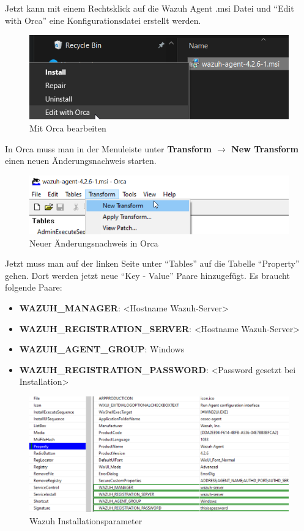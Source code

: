 Jetzt kann mit einem Rechtsklick auf die Wazuh Agent .msi Datei und ``Edit with Orca'' eine Konfigurationsdatei erstellt werden.
\begin{figure}[H]
    \centering
    \includegraphics[width=0.7\linewidth]{../img/agent/edit-with-orca.png}
    \caption{Mit Orca bearbeiten}
\end{figure}

In Orca muss man in der Menuleiste unter \textbf{Transform $\rightarrow$ New Transform} einen neuen Änderungsnachweis starten.
\begin{figure}[H]
    \centering
    \includegraphics[width=0.7\linewidth]{../img/agent/new-transform.png}
    \caption{Neuer Änderungsnachweis in Orca}
\end{figure}

Jetzt muss man auf der linken Seite unter ``Tables'' auf die Tabelle ``Property'' gehen.
Dort werden jetzt neue ``Key - Value'' Paare hinzugefügt.
Es braucht folgende Paare:
\begin{itemize}
    \item \textbf{WAZUH\_MANAGER}: <Hostname Wazuh-Server>
    \item \textbf{WAZUH\_REGISTRATION\_SERVER}: <Hostname Wazuh-Server>
    \item \textbf{WAZUH\_AGENT\_GROUP}: Windows
    \item \textbf{WAZUH\_REGISTRATION\_PASSWORD}: <Password gesetzt bei Installation>
\end{itemize}

\begin{figure}[H]
    \centering
    \includegraphics[width=0.7\linewidth]{../img/agent/Orca-Edit.png}
    \caption{Wazuh Installationsparameter}
\end{figure}

